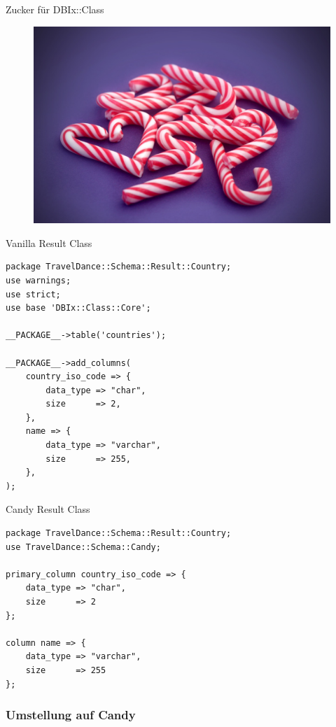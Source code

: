 \begin{frame}{Zucker für DBIx::Class}
\begin{figure}[!ht]
\centering
\includegraphics[width=0.8\linewidth]{img/candy-cane.jpg}
\end{figure}
\end{frame}

\begin{frame}[fragile]{Vanilla Result Class}
\begin{lstlisting}
package TravelDance::Schema::Result::Country;
use warnings;
use strict;
use base 'DBIx::Class::Core';

__PACKAGE__->table('countries');

__PACKAGE__->add_columns(
    country_iso_code => {
        data_type => "char",
        size      => 2,
    },
    name => {
        data_type => "varchar",
        size      => 255,
    },
);
\end{lstlisting}
\end{frame}

\begin{frame}[fragile]{Candy Result Class}
\begin{lstlisting}
package TravelDance::Schema::Result::Country;
use TravelDance::Schema::Candy;

primary_column country_iso_code => {
    data_type => "char",
    size      => 2
};

column name => {
    data_type => "varchar",
    size      => 255
};
\end{lstlisting}
\end{frame}

\subsubsection{Umstellung auf Candy}

